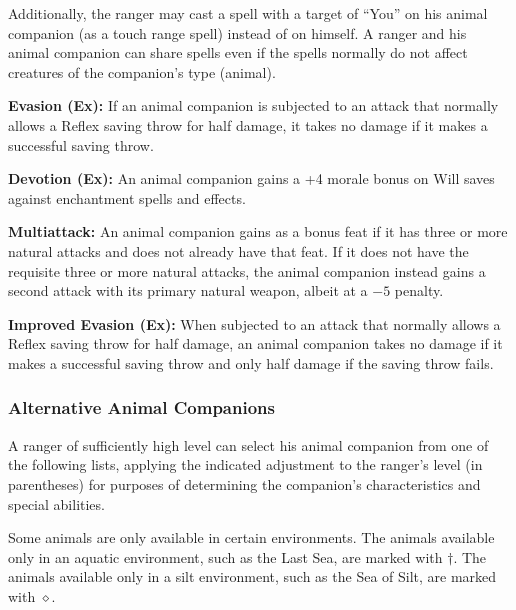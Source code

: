 Additionally, the ranger may cast a spell with a target of ``You'' on his animal companion (as a touch range spell) instead of on himself. A ranger and his animal companion can share spells even if the spells normally do not affect creatures of the companion's type (animal).

\textbf{Evasion (Ex):} If an animal companion is subjected to an attack that normally allows a Reflex saving throw for half damage, it takes no damage if it makes a successful saving throw.

\textbf{Devotion (Ex):} An animal companion gains a +4 morale bonus on Will saves against enchantment spells and effects.

\textbf{Multiattack:} An animal companion gains  as a bonus feat if it has three or more natural attacks and does not already have that feat. If it does not have the requisite three or more natural attacks, the animal companion instead gains a second attack with its primary natural weapon, albeit at a $-5$ penalty.

\textbf{Improved Evasion (Ex):} When subjected to an attack that normally allows a Reflex saving throw for half damage, an animal companion takes no damage if it makes a successful saving throw and only half damage if the saving throw fails.

\subsubsection{Alternative Animal Companions}
A ranger of sufficiently high level can select his animal companion from one of the following lists, applying the indicated adjustment to the ranger's level (in parentheses) for purposes of determining the companion's characteristics and special abilities.

Some animals are only available in certain environments. The animals available only in an aquatic environment, such as the Last Sea, are marked with $\dagger$. The animals available only in a silt environment, such as the Sea of Silt, are marked with $\diamond$.


